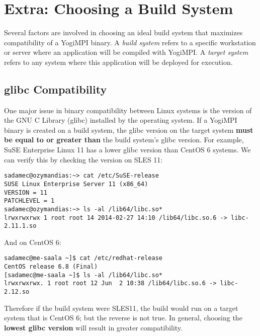\documentclass{article}
\begin{document}
\section{Extra: Choosing a Build System}
\label{choosebuild}
Several factors are involved in choosing an ideal build system that maximizes compatibility of a YogiMPI binary. A \textit{build system} refers to a specific workstation or server where an application will be compiled with YogiMPI.  A \textit{target system} refers to any system where this application will be deployed for execution.
\subsection{glibc Compatibility}
One major issue in binary compatibility between Linux systems is the version of the GNU C Library (glibc) installed by the operating system. If a YogiMPI binary is created on a build system, the glibc version on the target system \textbf{must be equal to or greater than} the build system's glibc version.
For example, SuSE Enterprise Linux 11 has a lower glibc version than CentOS 6 systems. We can verify this by checking the version on SLES 11:
\begin{verbatim}
sadamec@ozymandias:~> cat /etc/SuSE-release 
SUSE Linux Enterprise Server 11 (x86_64)
VERSION = 11
PATCHLEVEL = 1
sadamec@ozymandias:~> ls -al /lib64/libc.so*
lrwxrwxrwx 1 root root 14 2014-02-27 14:10 /lib64/libc.so.6 -> libc-2.11.1.so
\end{verbatim}
And on CentOS 6:
\begin{verbatim}
sadamec@me-saala ~]$ cat /etc/redhat-release 
CentOS release 6.8 (Final)
[sadamec@me-saala ~]$ ls -al /lib64/libc.so*
lrwxrwxrwx. 1 root root 12 Jun  2 10:38 /lib64/libc.so.6 -> libc-2.12.so
\end{verbatim}
Therefore if the build system were SLES11, the build would run on a target system that is CentOS 6; but the reverse is not true. In general, choosing the \textbf{lowest glibc version} will result in greater compatibility.
\end{document}
